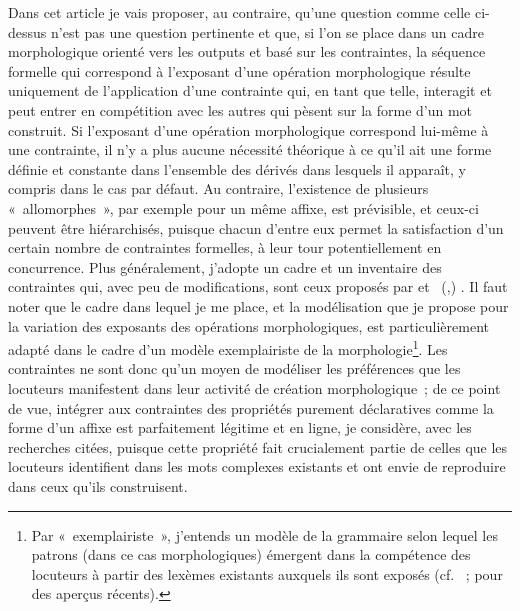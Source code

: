 \documentclass[output=paper]{langsci/langscibook}
\begin{document}
\newpage 
Dans cet article je vais proposer, au contraire, qu'une question comme
celle ci-dessus n'est pas une question pertinente et que, si l'on se
place dans un cadre morphologique orienté vers les outputs et basé sur
les contraintes, la séquence formelle qui correspond à l'exposant d'une
opération morphologique résulte uniquement de l'application d'une
contrainte qui, en tant que telle, interagit et peut entrer en
compétition avec les autres qui pèsent sur la forme d'un mot construit.
Si l'exposant d'une opération morphologique correspond lui-même à une
contrainte, il n'y a plus aucune nécessité théorique à ce qu'il ait une
forme définie et constante dans l'ensemble des dérivés dans lesquels il
apparaît, y compris dans le cas par défaut. Au contraire, l'existence de
plusieurs «~allomorphes~», par exemple pour un même affixe, est
prévisible, et ceux-ci peuvent être hiérarchisés, puisque chacun d'entre
eux permet la satisfaction d'un certain nombre de contraintes formelles,
à leur tour potentiellement en concurrence. Plus généralement, j'adopte
un cadre et un inventaire des contraintes qui, avec peu de
modifications, sont ceux proposés par %
\citet{Plenat-Roche2014} %
%
et 
%
\citeauthor{Roche14}~(\citeyear{Roche14},\citeyear{Roche16})%
%
. Il faut noter que le cadre dans lequel je me place,
et la modélisation que je propose pour la variation des exposants des
opérations morphologiques, est particulièrement adapté dans le cadre
d'un modèle exemplairiste de la morphologie\footnote{Par
  «~exemplairiste~», j'entends un modèle de la grammaire selon lequel les
  patrons (dans ce cas morphologiques) émergent dans la compétence des
  locuteurs à partir des lexèmes existants auxquels ils sont exposés
(cf. 
\citealt{bybee06,Bybee2013}~; \citealt{blevins2009.OUP} %
 pour des aperçus récents).}. Les contraintes ne sont donc qu'un moyen de modéliser les
préférences que les locuteurs manifestent dans leur activité de création
morphologique~; de ce point de vue, intégrer aux contraintes des
propriétés purement déclaratives comme la forme d'un affixe est
parfaitement légitime et en ligne, je considère, avec les recherches
citées, puisque cette propriété fait crucialement partie de celles que
les locuteurs identifient dans les mots complexes existants et ont envie
de reproduire dans ceux qu'ils construisent.
\end{document}
